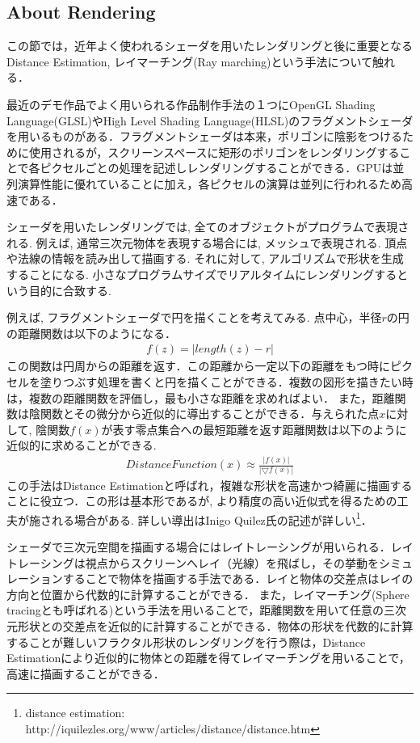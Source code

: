 \subsection{About Rendering}

この節では，近年よく使われるシェーダを用いたレンダリングと後に重要となるDistance Estimation, レイマーチング(Ray marching)という手法について触れる．

最近のデモ作品でよく用いられる作品制作手法の１つにOpenGL Shading Language(GLSL)やHigh Level Shading Language(HLSL)のフラグメントシェーダを用いるものがある．フラグメントシェーダは本来，ポリゴンに陰影をつけるために使用されるが，スクリーンスペースに矩形のポリゴンをレンダリングすることで各ピクセルごとの処理を記述しレンダリングすることができる．GPUは並列演算性能に優れていることに加え，各ピクセルの演算は並列に行われるため高速である．

シェーダを用いたレンダリングでは, 全てのオブジェクトがプログラムで表現される.
例えば,  通常三次元物体を表現する場合には, メッシュで表現される. 
頂点や法線の情報を読み出して描画する.
それに対して, アルゴリズムで形状を生成することになる.  
小さなプログラムサイズでリアルタイムにレンダリングするという目的に合致する. 

例えば, フラグメントシェーダで円を描くことを考えてみる. 
点中心，半径$r$の円の距離関数は以下のようになる．
\begin{eqnarray*}
 f(z) = | length(z) - r |
\end{eqnarray*}
この関数は円周からの距離を返す．この距離から一定以下の距離をもつ時にピクセルを塗りつぶす処理を書くと円を描くことができる．複数の図形を描きたい時は，複数の距離関数を評価し，最も小さな距離を求めればよい．
また，距離関数は陰関数とその微分から近似的に導出することができる．与えられた点$x$に対して, 陰関数$f(x)$が表す零点集合への最短距離を返す距離関数は以下のように近似的に求めることができる. 
\begin{eqnarray*}
 DistanceFunction(x) \approx \frac{|f(x)|}{|\bigtriangledown f(x)|}
\end{eqnarray*}
この手法はDistance Estimationと呼ばれ，複雑な形状を高速かつ綺麗に描画することに役立つ．この形は基本形であるが, より精度の高い近似式を得るための工夫が施される場合がある. 詳しい導出はInigo Quilez氏の記述が詳しい\footnote{distance estimation: http://iquilezles.org/www/articles/distance/distance.htm}．

シェーダで三次元空間を描画する場合にはレイトレーシングが用いられる．レイトレーシングは視点からスクリーンへレイ（光線）を飛ばし，その挙動をシミュレーションすることで物体を描画する手法である．レイと物体の交差点はレイの方向と位置から代数的に計算することができる．
また，レイマーチング(Sphere tracingとも呼ばれる)\cite{sphereTracing}という手法を用いることで，距離関数を用いて任意の三次元形状との交差点を近似的に計算することができる．物体の形状を代数的に計算することが難しいフラクタル形状のレンダリングを行う際は，Distance Estimationにより近似的に物体との距離を得てレイマーチングを用いることで，高速に描画することができる．


